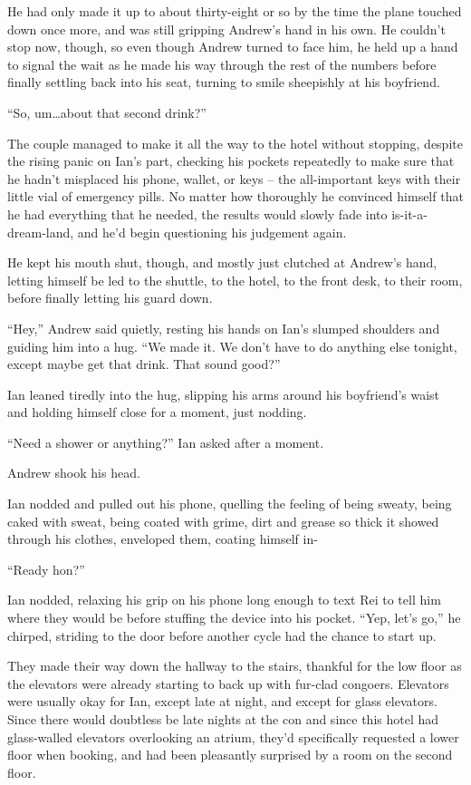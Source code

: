 He had only made it up to about thirty-eight or so by the time the plane touched down once more, and was still gripping Andrew's hand in his own. He couldn't stop now, though, so even though Andrew turned to face him, he held up a hand to signal the wait as he made his way through the rest of the numbers before finally settling back into his seat, turning to smile sheepishly at his boyfriend.

``So, um\ldots{}about that second drink?''

\secdiv

The couple managed to make it all the way to the hotel without stopping, despite the rising panic on Ian's part, checking his pockets repeatedly to make sure that he hadn't misplaced his phone, wallet, or keys -- the all-important keys with their little vial of emergency pills. No matter how thoroughly he convinced himself that he had everything that he needed, the results would slowly fade into is-it-a-dream-land, and he'd begin questioning his judgement again.

He kept his mouth shut, though, and mostly just clutched at Andrew's hand, letting himself be led to the shuttle, to the hotel, to the front desk, to their room, before finally letting his guard down.

``Hey,'' Andrew said quietly, resting his hands on Ian's slumped shoulders and guiding him into a hug. ``We made it. We don't have to do anything else tonight, except maybe get that drink. That sound good?''

Ian leaned tiredly into the hug, slipping his arms around his boyfriend's waist and holding himself close for a moment, just nodding.

``Need a shower or anything?'' Ian asked after a moment.

Andrew shook his head.

Ian nodded and pulled out his phone, quelling the feeling of being sweaty, being caked with sweat, being coated with grime, dirt and grease so thick it showed through his clothes, enveloped them, coating himself in-

``Ready hon?''

Ian nodded, relaxing his grip on his phone long enough to text Rei to tell him where they would be before stuffing the device into his pocket. ``Yep, let's go,'' he chirped, striding to the door before another cycle had the chance to start up.

They made their way down the hallway to the stairs, thankful for the low floor as the elevators were already starting to back up with fur-clad congoers. Elevators were usually okay for Ian, except late at night, and except for glass elevators. Since there would doubtless be late nights at the con and since this hotel had glass-walled elevators overlooking an atrium, they'd specifically requested a lower floor when booking, and had been pleasantly surprised by a room on the second floor.

